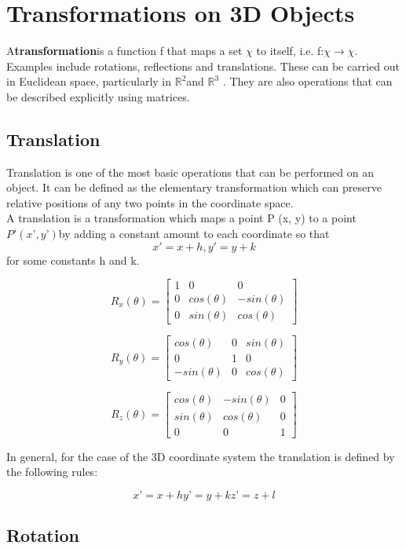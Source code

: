 \documentclass[12pt]{report}
\begin{document}
\section{Transformations on 3D Objects}


A\textbf{transformation}is a function f that maps a set $\chi$ to itself, i.e.   f:$\chi \rightarrow \chi$. Examples include rotations, reflections and translations. These can be carried out in Euclidean space, particularly in $\mathbb{R}^2 $and $\mathbb{R}^3$ . They are also operations that can be described explicitly using matrices.

\subsection{Translation}
Translation is one of the most basic operations that can be performed on an object. It can be defined as the elementary transformation which can preserve relative positions of any two points in the coordinate space. 
\vspace{0.3cm}
\\
A translation is a transformation which maps a point P (x, y) to a point $ P' (x’ , y’) $by adding a constant amount to each coordinate so that 
\[ x' = x + h, y' = y + k \] for some constants h and k.

\[ R_{x}(\theta) = \begin{bmatrix}
1 & 0 & 0 \\
0 & cos(\theta) & -sin(\theta) \\
0 & sin(\theta) & cos(\theta) 
\end{bmatrix} \]


\[ R_{y}(\theta) = \begin{bmatrix}
cos(\theta) & 0 & sin(\theta) \\
0 & 1 & 0 \\
-sin(\theta) & 0 & cos(\theta) 
\end{bmatrix} \]


\[ R_{z}(\theta) = \begin{bmatrix}
cos(\theta) & -sin(\theta) & 0 \\
sin(\theta) & cos(\theta) & 0 \\
0 & 0 & 1 
\end{bmatrix} \]

In general, for the case of the 3D coordinate system the translation is defined by the following rules:

\[ 		x’ = x + h	y’ = y + k	z’ = z + l  \]

\subsection{Rotation}
\end{document}
